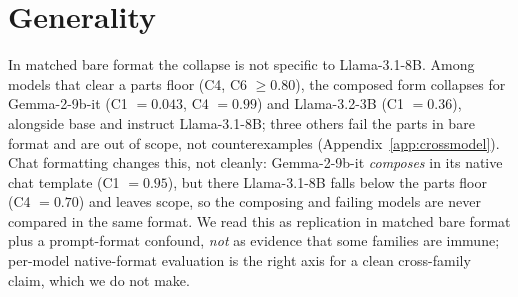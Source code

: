 \section{Generality}
\label{sec:generality}

In matched bare format the collapse is not specific to Llama-3.1-8B. Among models that clear a
parts floor (C4, C6 $\geq 0.80$), the composed form collapses for Gemma-2-9b-it (C1 $= 0.043$,
C4 $= 0.99$) and Llama-3.2-3B (C1 $= 0.36$), alongside base and instruct Llama-3.1-8B; three
others fail the parts in bare format and are out of scope, not counterexamples
(Appendix~\ref{app:crossmodel}). Chat formatting changes this, not cleanly: Gemma-2-9b-it
\emph{composes} in its native chat template (C1 $= 0.95$), but there Llama-3.1-8B falls below the
parts floor (C4 $= 0.70$) and leaves scope, so the composing and failing models are never compared
in the same format. We read this as replication in matched bare format plus a prompt-format
confound, \emph{not} as evidence that some families are immune; per-model native-format evaluation
is the right axis for a clean cross-family claim, which we do not make.
